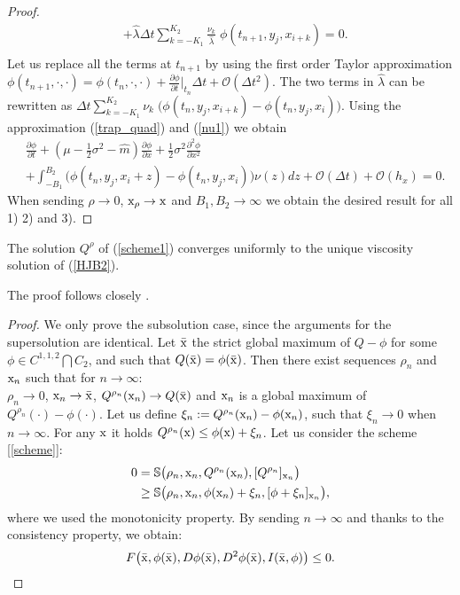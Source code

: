 \begin{proof}
\begin{align*}
   &+ \hat \lambda \Delta t \sum_{k = -K_1}^{K_2} \frac{\nu_k}{\hat \lambda} \; \phi(t_{n+1},y_j,x_{i+k})  = 0. \\
   \end{align*}
Let us replace all the terms at $t_{n+1}$ by using the first order Taylor approximation 
$\phi(t_{n+1},\cdot,\cdot) = \phi(t_{n},\cdot,\cdot) + \frac{\partial \phi}{\partial t}\bigg|_{t_n} \Delta t + \mathcal{O}(\Delta t^2)$.
The two terms in $\hat \lambda$ can be rewritten as $ \Delta t \sum_{k = -K_1}^{K_2} \nu_k \; \bigl( \phi(t_{n},y_j,x_{i+k}) - \phi(t_{n},y_j,x_{i}) \bigr)$. Using the 
approximation (\ref{trap_quad}) and (\ref{nu1}) we obtain
\begin{align*}
  & \frac{\partial \phi}{\partial t} + (\mu -\frac{1}{2}\sigma^2 -\hat m) \frac{\partial \phi}{\partial x} + \frac{1}{2} \sigma^2 \frac{\partial^2 \phi}{\partial x^2} \\
  & + \int_{-B_1}^{B_2} \bigl( \phi(t_{n},y_j,x_{i}+z) - \phi(t_{n},y_j,x_{i}) \bigr) \nu(z) dz + \mathcal{O}(\Delta t) + \mathcal{O}(h_x) = 0.    
\end{align*}
When sending $\rho \to 0$, $\mathrm{x}_{\rho} \to \mathrm{x}$ and $B_1,B_2 \to \infty$ we obtain the desired result for all 1) 2) and 3).
\end{proof}



\begin{Theorem}\label{theorem2}
 The solution $Q^{\rho}$ of (\ref{scheme1}) converges uniformly to the unique viscosity solution of (\ref{HJB2}).
\end{Theorem}
\noindent
The proof follows closely \cite{BaSo91}. 
\begin{proof}
We only prove the subsolution case, since the arguments for the supersolution are identical.
Let $\bar {\mathrm{x}}$ the strict global maximum of $Q-\phi$ for some $\phi \in C^{1,1,2} \bigcap C_2$, and such that $Q(\bar {\mathrm{x}}) = \phi(\bar {\mathrm{x}})$.
Then there exist sequences $\rho_n$ and $\mathrm{x}_n$ such that for $n\to \infty$: \\
$\rho_n \to 0$, $\mathrm{x}_n \to \bar {\mathrm{x}}$, $Q^{\rho_n}(\mathrm{x}_n) \to Q(\bar {\mathrm{x}})$ and $\mathrm{x}_n$ is a global maximum of $Q^{\rho_n}(\cdot) - \phi(\cdot)$. 
Let us define $\xi_n := Q^{\rho_n}(\mathrm{x}_n) - \phi(\mathrm{x}_n)$, such that $\xi_n \to 0$ when $n\to \infty$. For any $\mathrm{x}$ it holds $Q^{\rho_n}(\mathrm{x}) \leq \phi(\mathrm{x}) +\xi_n $.
Let us consider the scheme [\ref{scheme}]:
\begin{align*}
 0 =& \; \mathbb{S} \bigl( \rho_n, \mathrm{x}_n, Q^{\rho_ n}(\mathrm{x}_n), [Q^{\rho_ n}]_{\mathrm{x}_n} \bigr) \\
 \geq& \; \mathbb{S} \bigl( \rho_n, \mathrm{x}_n, \phi(\mathrm{x}_n) + \xi_n, [\phi + \xi_n]_{\mathrm{x}_n} \bigr),
\end{align*}
where we used the monotonicity property. By sending $n\to\infty$ and thanks to the consistency property, we obtain: 
$$ F\bigl(\bar {\mathrm{x}}, \phi(\bar {\mathrm{x}}), D\phi(\bar {\mathrm{x}}), D^2\phi(\bar {\mathrm{x}}), I(\bar {\mathrm{x}},\phi) \bigr) \leq 0. $$
\end{proof}







